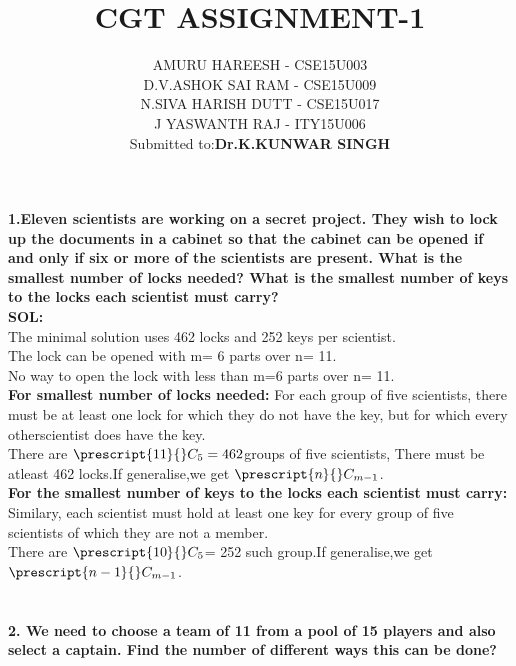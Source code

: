 \documentclass[8pt,a4paper]{article}
\newcommand\Mycomb[2][n]{\prescript{#1\mkern-0.5mu}{}C_{#2}}
\begin{document}
\title{CGT ASSIGNMENT-1}
\author{{AMURU HAREESH - CSE15U003\\D.V.ASHOK SAI RAM - CSE15U009\\N.SIVA HARISH DUTT - CSE15U017\\J YASWANTH RAJ - ITY15U006\\Submitted to:\textbf{Dr.K.KUNWAR SINGH}}}
\maketitle

\section{}

\textbf{1.Eleven scientists are working on a secret project. They wish to lock up the documents
in a cabinet so that the cabinet can be opened if and only if six or more of the scientists
are present. What is the smallest number of locks needed? What is the smallest number
of keys to the locks each scientist must carry?}\\

\textbf{SOL:}\\The minimal solution uses 462 locks and 252 keys per scientist.\\
The lock can be opened with m= 6 parts over n= 11.\\
No way to open the lock with less than m=6 parts over n= 11.\\
\textbf{For smallest number of locks needed:}
For each group of five scientists, there must be at least one lock for which they do not have the key, but for which every otherscientist does have the key.\\There are $\Mycomb[11]{5}=462$groups of five scientists, There must be atleast 462 locks.If generalise,we get $\Mycomb[n]{m-1}$.\\
\textbf{ For the smallest number of keys to the locks each scientist must carry:}
Similary, each scientist must hold at least one key for every group of five scientists of which they are not a member.\\There are $\Mycomb[10]{5}$= 252 such group.If generalise,we get  $\Mycomb[n-1]{m-1}$.


\section{}

\textbf{2. We need to choose a team of 11 from a pool of 15 players and also select a captain. Find
the number of different ways this can be done?}\\
\end{document}
